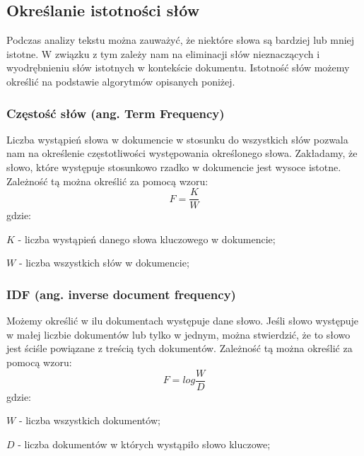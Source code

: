 \documentclass{classrep}
\begin{document}
\subsection{Określanie istotności słów}
Podczas analizy tekstu można zauważyć, że niektóre słowa są bardziej lub mniej istotne. W związku z tym zależy nam
na eliminacji słów nieznaczących i wyodrębnieniu słów istotnych w kontekście dokumentu. Istotność słów możemy określić
na podstawie algorytmów opisanych poniżej.


\subsubsection{Częstość słów (ang. Term Frequency)}
Liczba wystąpień słowa w dokumencie w stosunku do wszystkich słów pozwala nam na określenie częstotliwości występowania
określonego słowa. Zakładamy, że słowo, które występuje stosunkowo rzadko w dokumencie jest wysoce istotne. Zależność tą
można określić za pomocą wzoru:
\begin{equation}
    F=\frac{K}{W}
\end{equation}
gdzie:\\
\begin{description}
    \item $K$ - liczba wystąpień danego słowa kluczowego w dokumencie;
    \item $W$ - liczba wszystkich słów w dokumencie;
\end{description}

\subsubsection{IDF (ang. inverse document frequency)}
Możemy określić w ilu dokumentach występuje dane słowo. Jeśli słowo występuje w małej liczbie dokumentów lub tylko w
jednym, można stwierdzić, że to słowo jest ściśle powiązane z treścią tych dokumentów. Zależność tą można określić za
pomocą wzoru:
\begin{equation}
    F=log \frac{W}{D}
\end{equation}
gdzie:\\
\begin{description}
    \item $W$ - liczba wszystkich dokumentów;
    \item $D$ - liczba dokumentów w których wystąpiło słowo kluczowe;
\end{description}
\end{document}
